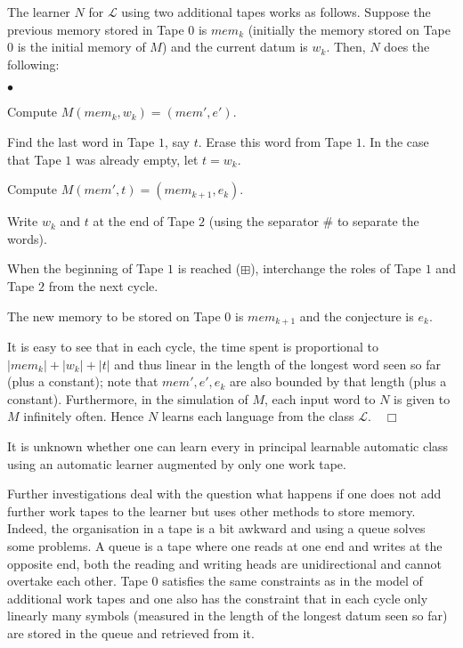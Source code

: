 \documentclass{LMCS}
\newcommand{\CalL}{{\mathcal L}}
\theoremstyle{plain}\newtheorem{athm}[thm]{Theorem}
\theoremstyle{plain}\newtheorem{aprop}[thm]{Proposition}
\theoremstyle{plain}\newtheorem{aprob}[thm]{Open Problem}
\theoremstyle{plain}\newtheorem{acor}[thm]{Corollary}
\theoremstyle{plain}\newtheorem{alem}[thm]{Lemma}
\theoremstyle{definition}\newtheorem{adefn}[thm]{Definition}
\theoremstyle{definition}\newtheorem{arem}[thm]{Remark}
\theoremstyle{plain}\newtheorem{aexmp}[thm]{Example}
\theoremstyle{plain}\newtheorem{aclm}[thm]{Claim}
\def\niceqed{~~$\Box$}
\begin{document}
The learner $N$ for $\CalL$ using two additional tapes works as follows.
Suppose the previous memory stored in Tape 0 is $mem_k$ (initially the memory
stored on Tape $0$ is the initial memory of $M$)
and the current datum is $w_k$. Then, $N$ does the following:
\begin{iteMize}{$\bullet$}
\item Compute $M(mem_k,w_k)=(mem',e')$.
\item Find the last word in Tape $1$, say $t$. Erase this word from Tape $1$.
      In the case that Tape $1$ was already empty, let $t=w_k$.
\item Compute $M(mem',t)=(mem_{k+1},e_k)$.
\item Write $w_k$ and $t$ at the end of Tape $2$ (using the separator $\#$ to
      separate the words).
\item When the beginning of Tape $1$ is reached ($\boxplus$), interchange 
      the roles of Tape $1$ and Tape $2$ from the next cycle.
\item The new memory to be stored on Tape $0$ is $mem_{k+1}$ and 
      the conjecture is $e_k$.
\end{iteMize}
It is easy to see that in each cycle, the time spent is
proportional to $|mem_k|+|w_k|+|t|$ and thus linear in the length
of the longest word seen so far (plus a constant); note that 
$mem',e',e_k$ are also bounded
by that length (plus a constant). Furthermore, in the simulation of
$M$, each input word to $N$ is given to $M$ infinitely often.
Hence $N$ learns each language from the class $\CalL$.\niceqed

\begin{oprob}
It is unknown whether one can learn every in principal learnable
automatic class using an automatic learner augmented by only one
work tape.
\end{oprob}


\medskip
\noindent
Further investigations deal with the question what happens if one does
not add further work tapes to the learner but uses other methods to
store memory.
Indeed, the organisation in a tape is a bit awkward and using a queue solves
some problems. A queue is a tape where one reads at one end and writes at the
opposite end, both the reading and writing heads are unidirectional and cannot
overtake each other. Tape $0$ satisfies the same constraints as in the model
of additional work tapes and one also has the constraint that in each cycle
only linearly many symbols (measured in the length of the longest datum seen
so far) are stored in the queue and retrieved from it.
\end{document}
